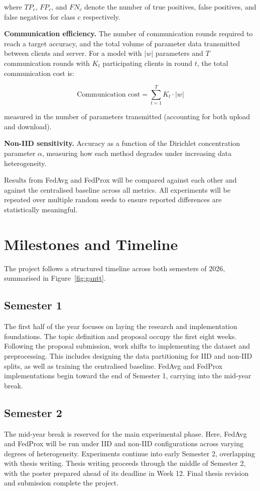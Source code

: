 \documentclass[12pt,openany,a4paper]{book}
\begin{document}
where $TP_c$, $FP_c$, and $FN_c$ denote the number of true positives, false positives, and false negatives for class $c$ respectively.

\textbf{Communication efficiency.} The number of communication rounds required to reach a target accuracy, and the total volume of parameter data transmitted between clients and server. For a model with $|w|$ parameters and $T$ communication rounds with $K_t$ participating clients in round $t$, the total communication cost is:

\begin{equation}
\text{Communication cost} = \sum_{t=1}^{T} K_t \cdot |w|
\end{equation}

measured in the number of parameters transmitted (accounting for both upload and download).

\textbf{Non-IID sensitivity.} Accuracy as a function of the Dirichlet concentration parameter $\alpha$, measuring how each method degrades under increasing data heterogeneity.

Results from FedAvg and FedProx will be compared against each other and against
the centralised baseline across all metrics. All experiments will be repeated over multiple random seeds to ensure reported differences are statistically meaningful.

\section{Milestones and Timeline}
The project follows a structured timeline across both semesters of 2026, summarised in Figure~\ref{fig:gantt}.

\subsection{Semester 1}
The first half of the year focuses on laying the research and implementation foundations. The topic definition and proposal occupy the first eight weeks. Following the proposal submission, work shifts to implementing the dataset and preprocessing. This includes designing the data partitioning for IID and non-IID splits, as well as training the centralised baseline. FedAvg and FedProx implementations begin toward the end of Semester 1, carrying into the mid-year break.
\subsection{Semester 2}
The mid-year break is reserved for the main experimental phase. Here, FedAvg and FedProx will be run under IID and non-IID configurations across varying degrees of heterogeneity. Experiments continue into early Semester 2, overlapping with thesis writing. Thesis writing proceeds through the middle of Semester 2, with the poster prepared ahead of its deadline in Week 12. Final thesis revision and submission complete the project.
\end{document}

